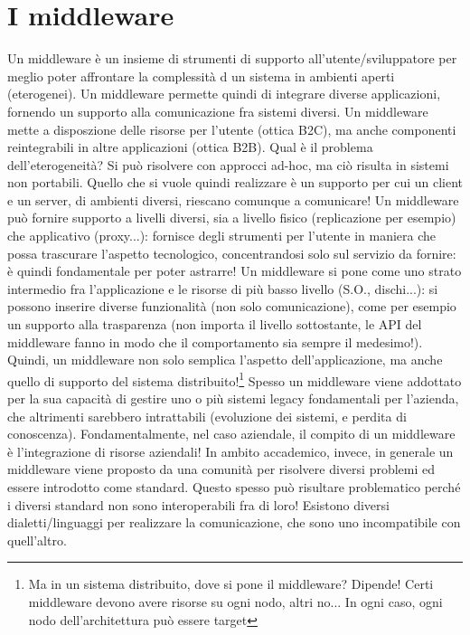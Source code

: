 \section{I middleware}
Un middleware è un insieme di strumenti di supporto all'utente/sviluppatore per meglio poter affrontare la complessità 
d un sistema in ambienti aperti (eterogenei). Un middleware permette quindi di integrare diverse applicazioni,
fornendo un supporto alla comunicazione fra sistemi diversi.
Un middleware mette a disposzione delle risorse per l'utente (ottica B2C), ma anche componenti reintegrabili in altre
applicazioni (ottica B2B).
Qual è il problema dell'eterogeneità? Si può risolvere con approcci ad-hoc, ma ciò risulta in sistemi non portabili.
Quello che si vuole quindi realizzare è un supporto per cui un client e un server, di ambienti diversi, riescano
comunque a comunicare!
Un middleware può fornire supporto a livelli diversi, sia a livello fisico (replicazione per esempio) che applicativo
(proxy...): fornisce degli strumenti per l'utente in maniera che possa trascurare l'aspetto tecnologico, 
concentrandosi solo sul servizio da fornire: è quindi fondamentale per poter astrarre!
Un middleware si pone come uno strato intermedio fra l'applicazione e le risorse di più basso livello 
(S.O., dischi...): si possono inserire diverse funzionalità (non solo comunicazione), come per esempio un supporto 
alla trasparenza (non importa il livello sottostante, le API del middleware fanno in modo che il comportamento sia
sempre il medesimo!). Quindi, un middleware non solo semplica l'aspetto dell'applicazione, ma anche quello di supporto
del sistema distribuito!\footnote{Ma in un sistema distribuito, dove si pone il middleware? Dipende! Certi middleware
devono avere risorse su ogni nodo, altri no... In ogni caso, ogni nodo dell'architettura può essere target}
Spesso un middleware viene addottato per la sua capacità di gestire uno o più sistemi legacy fondamentali per 
l'azienda, che altrimenti sarebbero intrattabili (evoluzione dei sistemi, e perdita di conoscenza). Fondamentalmente,
nel caso aziendale, il compito di un middleware è l'integrazione di risorse aziendali!
In ambito accademico, invece, in generale un middleware viene proposto da una comunità per risolvere diversi problemi 
ed essere introdotto come standard.
Questo spesso può risultare problematico perché i diversi standard non sono interoperabili fra di loro! Esistono 
diversi dialetti/linguaggi per realizzare la comunicazione, che sono uno incompatibile con quell'altro.
